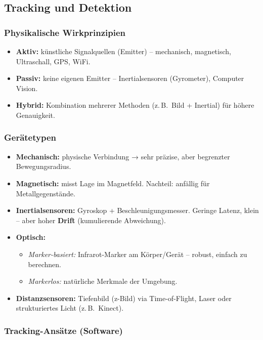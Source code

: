 \documentclass[12pt, a4paper]{article}
\begin{document}
\subsection{Tracking und Detektion}

\subsubsection*{Physikalische Wirkprinzipien}
\begin{itemize}
  \item \textbf{Aktiv:} künstliche Signalquellen (Emitter) -- mechanisch, magnetisch, Ultraschall, GPS, WiFi.
  \item \textbf{Passiv:} keine eigenen Emitter -- Inertialsensoren (Gyrometer), Computer Vision.
  \item \textbf{Hybrid:} Kombination mehrerer Methoden (z.\,B.\ Bild + Inertial) für höhere Genauigkeit.
\end{itemize}

\subsubsection*{Gerätetypen}
\begin{itemize}
  \item \textbf{Mechanisch:} physische Verbindung → sehr präzise, aber begrenzter Bewegungsradius.
  \item \textbf{Magnetisch:} misst Lage im Magnetfeld. Nachteil: anfällig für Metallgegenstände.
  \item \textbf{Inertialsensoren:} Gyroskop + Beschleunigungsmesser. Geringe Latenz, klein -- aber hoher \textbf{Drift} (kumulierende Abweichung).
  \item \textbf{Optisch:}
    \begin{itemize}
      \item \textit{Marker-basiert:} Infrarot-Marker am Körper/Gerät -- robust, einfach zu berechnen.
      \item \textit{Markerlos:} natürliche Merkmale der Umgebung.
    \end{itemize}
  \item \textbf{Distanzsensoren:} Tiefenbild (z-Bild) via Time-of-Flight, Laser oder strukturiertes Licht (z.\,B.\ Kinect).
\end{itemize}

\subsubsection*{Tracking-Ansätze (Software)}
\end{document}
